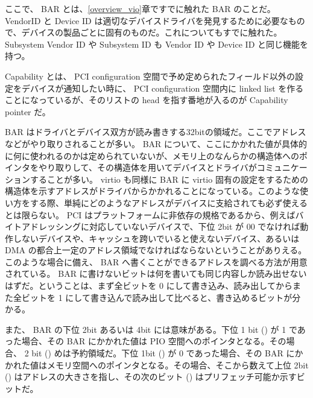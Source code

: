 \documentclass[a4paper,11pt,report]{ltjsbook}
\begin{document}
ここで、 BAR とは、\ref{overview_vio}章ですでに触れた BAR のことだ。 VendorID と Device ID は適切なデバイスドライバを発見するために必要なもので、デバイスの製品ごとに固有のものだ。これについてもすでに触れた。Subsystem Vendor ID や Subsystem ID も Vendor ID や Device ID と同じ機能を持つ。

Capability とは、 PCI configuration 空間で予め定められたフィールド以外の設定をデバイスが通知したい時に、 PCI configuration 空間内に linked list を作ることになっているが、そのリストの head を指す番地が入るのが Capability pointer だ。

BAR はドライバとデバイス双方が読み書きする32bitの領域だ。ここでアドレスなどがやり取りされることが多い。 BAR について、ここにかかれた値が具体的に何に使われるのかは定められていないが、メモリ上のなんらかの構造体へのポインタをやり取りして、その構造体を用いてデバイスとドライバがコミュニケーションすることが多い。 virtio も同様に BAR に virtio 固有の設定をするための構造体を示すアドレスがドライバからかかれることになっている。このような使い方をする際、単純にどのようなアドレスがデバイスに支給されても必ず使えるとは限らない。 PCI はプラットフォームに非依存の規格であるから、例えばバイトアドレッシングに対応していないデバイスで、下位 2bit が 00 でなければ動作しないデバイスや、キャッシュを跨いでいると使えないデバイス、あるいは DMA の都合上一定のアドレス領域でなければならないということがありえる。このような場合に備え、 BAR へ書くことができるアドレスを調べる方法が用意されている。 BAR に書けないビットは何を書いても同じ内容しか読み出せないはずだ。ということは、まず全ビットを 0 にして書き込み、読み出してからまた全ビットを 1 にして書き込んで読み出して比べると、書き込めるビットが分かる。

また、 BAR の下位 2bit あるいは 4bit には意味がある。下位 1 bit
()
が 1 であった場合、その BAR にかかれた値は PIO 空間へのポインタとなる。その場合、 2 bit
()
めは予約領域だ。下位 1bit
()
が 0 であった場合、その BAR にかかれた値はメモリ空間へのポインタとなる。その場合、そこから数えて上位 2bit
()
はアドレスの大きさを指し、その次のビット
()
はプリフェッチ可能か示すビットだ。
\end{document}
